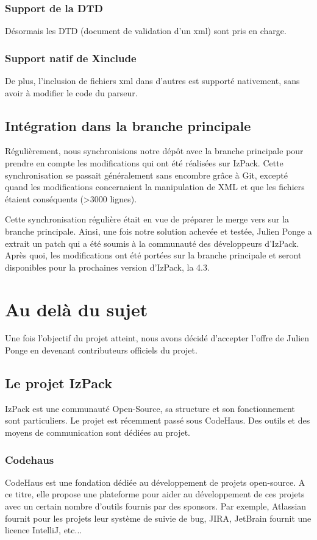 \subsubsection{Support de la DTD}
Désormais les DTD (document de validation d'un xml) sont pris en charge.
\subsubsection{Support natif de Xinclude}
De plus, l'inclusion de fichiers xml dans d'autres est supporté nativement, sans avoir à modifier le code du parseur.
\subsection{Intégration dans la branche principale}
Régulièrement, nous synchronisions notre dépôt avec la branche principale pour prendre en compte les modifications qui ont été réalisées sur IzPack.
Cette synchronisation se passait généralement sans encombre grâce à Git, excepté quand les modifications concernaient la manipulation de XML et que les fichiers étaient conséquents (>3000 lignes).

Cette synchronisation régulière était en vue de préparer le merge vers sur la branche principale.
Ainsi, une fois notre solution achevée et testée, Julien Ponge a extrait un patch qui a été soumis à la communauté des développeurs d'IzPack.
Après quoi, les modifications ont été portées sur la branche principale et seront disponibles pour la prochaines version d'IzPack, la 4.3.

\section{Au delà du sujet}
Une fois l'objectif du projet atteint, nous avons décidé d'accepter l'offre de Julien Ponge en devenant contributeurs officiels du projet.
\subsection{Le projet IzPack}
IzPack est une communauté Open-Source, sa structure et son fonctionnement sont particuliers.
Le projet est récemment passé sous CodeHaus.
Des outils et des moyens de communication sont dédiées au projet.
\subsubsection{Codehaus}
CodeHaus est une fondation dédiée au développement de projets open-source.
A ce titre, elle propose une plateforme pour aider au développement de ces projets avec un certain nombre d'outils fournis par des sponsors.
Par exemple, Atlassian fournit pour les projets leur système de suivie de bug, JIRA, JetBrain fournit une licence IntelliJ, etc...
